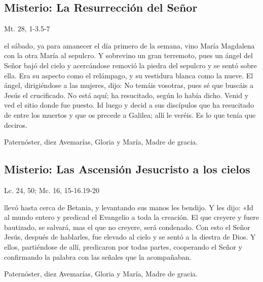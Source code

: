 \documentclass[./main.tex]{subfiles}
\newcounter{glorious-counter}
\begin{document}
\subsection*{ Misterio: La Resurrección del Señor}
\begin{flushright}
      {\color{red}Mt. 28, 1-3.5-7}
\end{flushright}
 el sábado, ya para amanecer el día primero de la semana, vino María Magdalena con la otra María al sepulcro. Y sobrevino un gran terremoto, 
pues un ángel del Señor bajó del cielo y acercándose removió la piedra del sepulcro y se sentó sobre ella. Era su aspecto como el relámpago, y su vestidura blanca como la nueve. 
El ángel, dirigiéndose a las mujeres, dijo: No temáis vosotras, pues sé que buscáis a Jesús el crucificado. No está aquí; ha resucitado, según lo había dicho. 
Venid y ved el sitio donde fue puesto. Id luego y decid a sus discípulos que ha resucitado de entre los muertos y que os precede a Galilea; allí le veréis. 
Es lo que tenía que deciros.

\begin{center}
      Paternóster, diez Avemarías, Gloria y María, Madre de gracia.
\end{center}

\subsection*{ Misterio: Las Ascensión Jesucristo a los cielos}
\begin{flushright}
      {\color{red}Lc. 24, 50; Mc. 16, 15-16.19-20}
\end{flushright}
 llevó hasta cerca de Betania, y levantando sus manos les bendijo. Y les dijo: «Id al mundo entero y predicad el Evangelio a toda la creación. 
El que creyere y fuere bautizado, se salvará, mas el que no creyere, será condenado. Con esto el Señor Jesús, después de hablarles, fue elevado al cielo y se sentó a la diestra de Dios. 
Y ellos, partiéndose de allí, predicaron por todas partes, cooperando el Señor y confirmando la palabra con las señales que la acompañaban.

\begin{center}
      Paternóster, diez Avemarías, Gloria y María, Madre de gracia.
\end{center}

\end{document}

